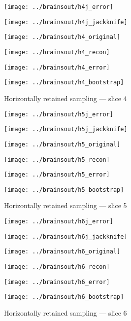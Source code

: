 \documentclass[review,supplement,onefignum,onetabnum,juq]{siamonline181217}
\begin{document}
\begin{figure}
\begin{centering}

\parbox{\imsize}{\texttt{[image: ../brainsout/h4j\_error]}}
\parbox{\imsize}{\texttt{[image: ../brainsout/h4j\_jackknife]}}

\vspace{\vertsep}

\parbox{\imsize}{\texttt{[image: ../brainsout/h4\_original]}}
\parbox{\imsize}{\texttt{[image: ../brainsout/h4\_recon]}}

\vspace{\vertsep}

\parbox{\imsize}{\texttt{[image: ../brainsout/h4\_error]}}
\parbox{\imsize}{\texttt{[image: ../brainsout/h4\_bootstrap]}}

\end{centering}
\caption{Horizontally retained sampling --- slice 4}
\end{figure}


\begin{figure}
\begin{centering}

\parbox{\imsize}{\texttt{[image: ../brainsout/h5j\_error]}}
\parbox{\imsize}{\texttt{[image: ../brainsout/h5j\_jackknife]}}

\vspace{\vertsep}

\parbox{\imsize}{\texttt{[image: ../brainsout/h5\_original]}}
\parbox{\imsize}{\texttt{[image: ../brainsout/h5\_recon]}}

\vspace{\vertsep}

\parbox{\imsize}{\texttt{[image: ../brainsout/h5\_error]}}
\parbox{\imsize}{\texttt{[image: ../brainsout/h5\_bootstrap]}}

\end{centering}
\caption{Horizontally retained sampling --- slice 5}
\end{figure}


\begin{figure}
\begin{centering}

\parbox{\imsize}{\texttt{[image: ../brainsout/h6j\_error]}}
\parbox{\imsize}{\texttt{[image: ../brainsout/h6j\_jackknife]}}

\vspace{\vertsep}

\parbox{\imsize}{\texttt{[image: ../brainsout/h6\_original]}}
\parbox{\imsize}{\texttt{[image: ../brainsout/h6\_recon]}}

\vspace{\vertsep}

\parbox{\imsize}{\texttt{[image: ../brainsout/h6\_error]}}
\parbox{\imsize}{\texttt{[image: ../brainsout/h6\_bootstrap]}}

\end{centering}
\caption{Horizontally retained sampling --- slice 6}
\end{figure}
\end{document}
